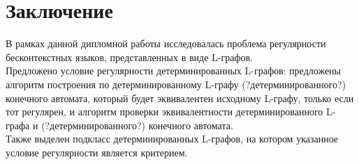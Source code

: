 \chapter{Заключение}						%
\label{chapt_conclusion}

В рамках данной дипломной работы исследовалась проблема регулярности бесконтекстных языков, представленных в виде L-графов.\\
Предложено условие регулярности детерминированных L-графов: предложены алгоритм построения по детерминированному L-графу (?детерминированного?) конечного автомата, который будет эквивалентен исходному L-графу, только если тот регулярен, и алгоритм проверки эквивалентности детерминированного L-графа и (?детерминированного?) конечного автомата.\\
Также выделен подкласс детерминированных L-графов, на котором указанное условие регулярности является критерием.

\clearpage